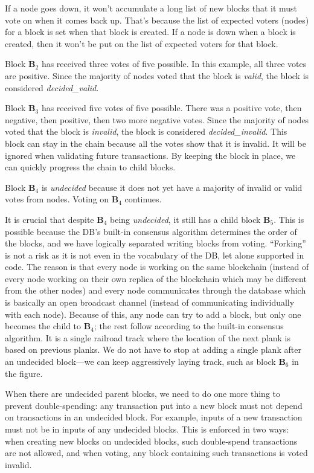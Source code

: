 If a node goes down, it won't accumulate a long list of new blocks that it must vote on when it comes back up. That's because the list of expected voters (nodes) for a block is set when that block is created. If a node is down when a block is created, then it won't be put on the list of expected voters for that block.

Block $\mathbf{B}_2$ has received three votes of five possible.
In this example, all three votes are positive.
Since the majority of nodes voted that the block is \textsf{\textit{valid}}, the block is considered \textsf{\textit{decided\_valid}}.

Block $\mathbf{B}_3$ has received five votes of five possible.
There was a positive vote, then negative, then positive, then two more negative votes.
Since the majority of nodes voted that the block is \textsf{\textit{invalid}}, the block is considered \textsf{\textit{decided\_invalid}}.
This block can stay in the chain because all the votes show that it is invalid.
It will be ignored when validating future transactions.
By keeping the block in place, we can quickly progress the chain to child blocks.

Block $\mathbf{B}_4$ is \textsf{\textit{undecided}} because it does not yet have a majority of invalid or valid votes from nodes.
Voting on $\mathbf{B}_4$ continues.

It is crucial that despite $\mathbf{B}_4$ being \textsf{\textit{undecided}}, it still has a child block $\mathbf{B}_5$.
This is possible because the DB’s built-in consensus algorithm determines the order of the blocks, and we have logically separated writing blocks from voting.
“Forking” is not a risk as it is not even in the vocabulary of the DB, let alone supported in code.
The reason is that every node is working on the same blockchain (instead of every node working on their own replica of the blockchain which may be different from the other nodes) and every node communicates through the database which is basically an open broadcast channel (instead of communicating individually with each node).
Because of this, any node can try to add a block, but only one becomes the child to $\mathbf{B}_4$; the rest follow according to the built-in consensus algorithm.
It is a single railroad track where the location of the next plank is based on previous planks.
We do not have to stop at adding a single plank after an undecided block—we can keep aggressively laying track, such as block $\mathbf{B}_6$ in the figure.

When there are undecided parent blocks, we need to do one more thing to prevent double-spending: any transaction put into a new block must not depend on transactions in an undecided block.
For example, inputs of a new transaction must not be in inputs of any undecided blocks.
This is enforced in two ways: when creating new blocks on undecided blocks, such double-spend transactions are not allowed, and when voting, any block containing such transactions is voted invalid.


